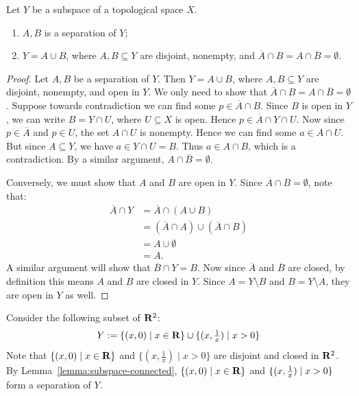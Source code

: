 \begin{lemma}\label{lemma:subspace-connected}
    Let $Y$ be a subspace of a topological space $X$.
        \begin{enumerate}[label = (\arabic*),itemsep=1pt,topsep=3pt]
            \item $A,B$ is a separation of $Y$;
            \item $Y = A \cup B$, where $A,B \subseteq Y$ are disjoint, nonempty, and $\overline{A} \cap B = A \cap \overline{B} = \emptyset$.
        \end{enumerate}
\end{lemma}
    \begin{proof}
        Let $A,B$ be a separation of $Y$. Then $Y = A \cup B$, where $A,B \subseteq Y$ are disjoint, nonempty, and open in $Y$. We only need to show that $\overline{A} \cap B = A \cap \overline{B} = \emptyset$. Suppose towards contradiction we can find some $p \in \overline{A} \cap B$. Since $B$ is open in $Y$, we can write $B = Y \cap U$, where $U \subseteq X$ is open. Hence $p \in \overline{A} \cap Y \cap U$. Now since $p \in \overline{A}$ and $p \in U$, the set $A \cap U$ is nonempty. Hence we can find some $a \in A \cap U$. But since $A \subseteq Y$, we have $a \in Y \cap U = B$. Thus $a \in A \cap B$, which is a contradiction. By a similar argument, $A \cap \overline{B} = \emptyset$.

        Conversely, we must show that $A$ and $B$ are open in $Y$. Since $\overline{A} \cap B = \emptyset$, note that:
            \begin{equation*}
            \begin{split}
                \overline{A} \cap Y 
                & = \overline{A} \cap (A \cup B) \\
                & = (\overline{A} \cap A ) \cup (\overline{A} \cap B) \\
                & = A \cup \emptyset \\
                & = A.
            \end{split}
            \end{equation*}
        A similar argument will show that $\overline{B} \cap Y = B$. Now since $\overline{A}$ and $\overline{B}$ are closed, by definition this means $A$ and $B$ are closed in $Y$. Since $A = Y \setminus B$ and $B = Y \setminus A$, they are open in $Y$ as well.
    \end{proof}

\begin{example}
    Consider the following subset of $\mathbf{R}^2$:
        \begin{equation*}
        \begin{split}
            Y:=\{(x,0) \mid x \in \mathbf{R}\} \cup \{(x, {\textstyle \frac{1}{x}}) \mid x > 0\}
        \end{split}
        \end{equation*}
    Note that $\{(x,0) \mid x \in \mathbf{R}\}$ and $\{(x,\frac{1}{x})\mid x > 0\}$ are disjoint and closed in $\mathbf{R}^2$. By Lemma~\ref{lemma:subspace-connected}, $\{(x,0) \mid x \in \mathbf{R}\}$ and $\{(x, {\textstyle \frac{1}{x}}) \mid x > 0\}$ form a separation of $Y$.
\end{example}

